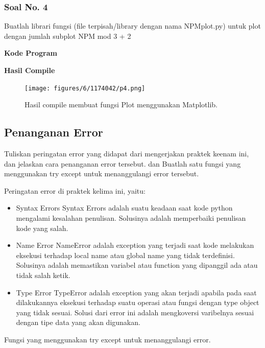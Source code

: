 \subsubsection{Soal No. 4}
\hfill \break
Buatlah librari fungsi (file terpisah/library dengan nama NPMplot.py) untuk plot dengan jumlah subplot NPM mod 3 + 2

\hfill \break
\textbf{Kode Program}



\hfill \break
\textbf{Hasil Compile}

\begin{figure}[H]
	\texttt{[image: figures/6/1174042/p4.png]}
	\centering
	\caption{Hasil compile membuat fungsi Plot menggunakan Matplotlib.}
\end{figure}


\subsection{Penanganan Error}
Tuliskan  peringatan  error  yang  didapat  dari  mengerjakan  praktek  keenam  ini, dan  jelaskan  cara  penanganan  error  tersebut. dan  Buatlah  satu  fungsi  yang menggunakan try except untuk menanggulangi error tersebut.

\hfill \break
Peringatan error di praktek kelima ini, yaitu:
\begin{itemize}
	\item Syntax Errors
	Syntax Errors adalah suatu keadaan saat kode python mengalami kesalahan penulisan. Solusinya adalah memperbaiki penulisan kode yang salah.
	
	\item Name Error
	NameError adalah exception yang terjadi saat kode melakukan eksekusi terhadap local name atau global name yang tidak terdefinisi. Solusinya adalah memastikan variabel atau function yang dipanggil ada atau tidak salah ketik.
	
	\item Type Error
	TypeError adalah exception yang akan terjadi apabila pada saat dilakukannya eksekusi terhadap suatu operasi atau fungsi dengan type object yang tidak sesuai. Solusi dari error ini adalah mengkoversi varibelnya sesuai dengan tipe data yang akan digunakan.
\end{itemize}
\hfill \break
Fungsi yang menggunakan try except untuk menanggulangi error.

